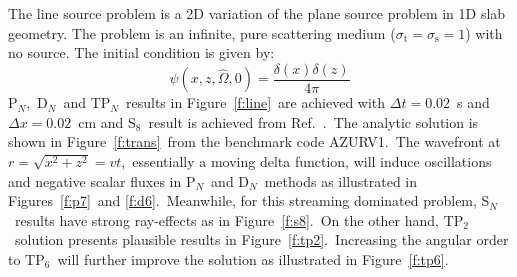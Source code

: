 \documentclass[review]{elsarticle}
\newcommand{\st}{\sigma_\mathrm{t}}
\newcommand{\pn}{P$_N$}
\newcommand{\dn}{D$_N$}
\newcommand{\sn}{S$_N$}
\newcommand{\sigmas}{\sigma_\mathrm{s}}
\begin{document}
{
The line source problem is a 2D variation of the plane source problem in 1D slab geometry. The problem is an infinite, pure scattering medium ($\st=\sigmas=1$) with no source. The initial condition is given by\cite{ganapol}:
	\begin{equation}
	\psi(x,z,\hat{\Omega},0)=\frac{\delta(x)\delta(z)}{4\pi}
	\end{equation}
\pn,\ \dn\ and T\pn\ results in Figure\ \ref{f:line}\ are achieved with $\Delta t=0.02$\ s and $\Delta x=0.02$\ cm and S$_8$\ result is achieved from Ref.\ \cite{mccfpn09}.\ The analytic solution is shown in Figure\ \ref{f:trans}\ from the benchmark code AZURV1\cite{ganapol}.\ The wavefront at $r=\sqrt{x^2+z^2}=vt$,\ essentially a moving delta function, will induce oscillations and negative scalar fluxes in \pn\ and \dn\ methods as illustrated in Figures\ \ref{f:p7}\ and \ref{f:d6}.\ Meanwhile, for this streaming dominated problem, \sn\ results have strong ray-effects as in Figure\ \ref{f:s8}.\ On the other hand, TP$_2$\ solution presents plausible results in Figure\ \ref{f:tp2}.\ Increasing the angular order to TP$_6$\ will further improve the solution as illustrated in Figure\ \ref{f:tp6}. }
\end{document}
